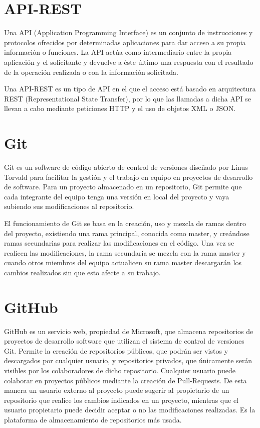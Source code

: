\documentclass[a4paper, 12pt]{book}
\begin{document}
\section{API-REST} 
\label{sec:api}

Una API (Application Programming Interface) es un conjunto de instrucciones y protocolos ofrecidos por determinadas aplicaciones para dar acceso a su propia información o funciones. La API actúa como intermediario entre la propia aplicación y el solicitante y devuelve a éste último una respuesta con el resultado de la operación realizada o con la información solicitada.

Una API-REST es un tipo de API en el que el acceso está basado en arquitectura REST (Representational State Transfer), por lo que las llamadas a dicha API se llevan a cabo mediante peticiones HTTP y el uso de objetos XML o JSON.

\section{Git} 
\label{sec:git}

Git\cite{git} es un software de código abierto de control de versiones diseñado por Linus Torvald para facilitar la gestión y el trabajo en equipo en proyectos de desarrollo de software.
Para un proyecto almacenado en un repositorio, Git permite que cada integrante del equipo tenga una versión en local del proyecto y vaya subiendo sus modificaciones al repositorio.

El funcionamiento de Git se basa en la creación, uso y mezcla de ramas dentro del proyecto, existiendo una rama principal, conocida como master, y creándose ramas secundarias para realizar las modificaciones en el código. Una vez se realicen las modificaciones, la rama secundaria se mezcla con la rama master y cuando otros miembros del equipo actualicen su rama master descargarán los cambios realizados sin que esto afecte a su trabajo.

\section{GitHub} 
\label{sec:github}

GitHub\cite{github} es un servicio web, propiedad de Microsoft, que almacena repositorios de proyectos de desarrollo software que utilizan el sistema de control de versiones Git. Permite la creación de repositorios públicos, que podrán ser vistos y descargados por cualquier usuario, y repositorios privados, que únicamente serán visibles por los colaboradores de dicho repositorio.
Cualquier usuario puede colaborar en proyectos públicos mediante la creación de Pull-Requests. De esta manera un usuario externo al proyecto puede sugerir al propietario de un repositorio que realice los cambios indicados en un proyecto, mientras que el usuario propietario puede decidir aceptar o no las modificaciones realizadas.
Es la plataforma de almacenamiento de repositorios más usada.
\end{document}
